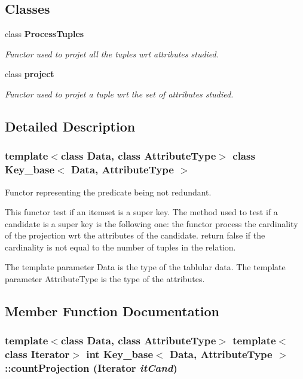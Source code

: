 \subsection*{Classes}
\begin{CompactItemize}
\item 
class {\bf Process\-Tuples}
\begin{CompactList}\small\item\em Functor used to projet all the tuples wrt attributes studied. \item\end{CompactList}\item 
class {\bf project}
\begin{CompactList}\small\item\em Functor used to projet a tuple wrt the set of attributes studied. \item\end{CompactList}\end{CompactItemize}


\subsection{Detailed Description}
\subsubsection*{template$<$class Data, class Attribute\-Type$>$ class Key\_\-base$<$ Data, Attribute\-Type $>$}

Functor representing the predicate being not redundant. 

This functor test if an itemset is a super key. The method used to test if a candidate is a super key is the following one: the functor process the cardinality of the projection wrt the attributes of the candidate. return false if the cardinality is not equal to the number of tuples in the relation.

The template parameter Data is the type of the tablular data. The template parameter Attribute\-Type is the type of the attributes. 



\subsection{Member Function Documentation}
\subsubsection{\setlength{\rightskip}{0pt plus 5cm}template$<$class Data, class Attribute\-Type$>$ template$<$class Iterator$>$ int {\bf Key\_\-base}$<$ Data, Attribute\-Type $>$::count\-Projection (Iterator {\em it\-Cand})\hspace{0.3cm}{\tt  [protected]}}\label{class_key__base_2ad0e062e502dd49018ce3f60691f12d}


